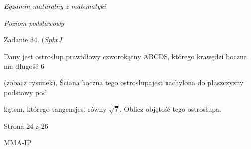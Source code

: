 \documentclass[a4paper,12pt]{article}
\begin{document}
{\it Egzamin maturalny z matematyki}

{\it Poziom podstawowy}

Zadanie 34. $(SpktJ$

Dany jest ostrosłup prawidłowy czworokątny ABCDS, którego krawędzí boczna ma długość 6

(zobacz rysunek). Ściana boczna tego ostrosłupajest nachylona do płaszczyzny podstawy pod

kątem, którego tangensjest równy $\sqrt{7}$. Oblicz objętość tego ostrosłupa.

Strona 24 z 26

MMA-IP
\end{document}
